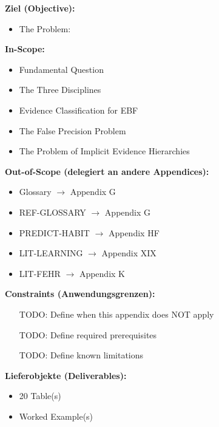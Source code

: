 \documentclass[11pt, a4paper]{article}
\begin{document}
\begin{tcolorbox}[
    colback=orange!5!white,
    colframe=orange!75!black,
    title={\textbf{Appendix Scope: Ziel / In-Scope / Out-of-Scope / Constraints}},
    fonttitle=\bfseries
]

\textbf{Ziel (Objective):}
\begin{itemize}[nosep]
    \item The Problem:
\end{itemize}

\textbf{In-Scope:}
\begin{itemize}[nosep]
    \item Fundamental Question
    \item The Three Disciplines
    \item Evidence Classification for EBF
    \item The False Precision Problem
    \item The Problem of Implicit Evidence Hierarchies
\end{itemize}

\textbf{Out-of-Scope (delegiert an andere Appendices):}
\begin{itemize}[nosep]
    \item Glossary $\rightarrow$ Appendix G
    \item REF-GLOSSARY $\rightarrow$ Appendix G
    \item PREDICT-HABIT $\rightarrow$ Appendix HF
    \item LIT-LEARNING $\rightarrow$ Appendix XIX
    \item LIT-FEHR $\rightarrow$ Appendix K
\end{itemize}

\textbf{Constraints (Anwendungsgrenzen):}
\begin{itemize}[nosep]
    \item [TODO: Define when this appendix does NOT apply]
    \item [TODO: Define required prerequisites]
    \item [TODO: Define known limitations]
\end{itemize}

\textbf{Lieferobjekte (Deliverables):}
\begin{itemize}[nosep]
    \item 20 Table(s)
    \item Worked Example(s)
\end{itemize}

\end{tcolorbox}
\end{document}
